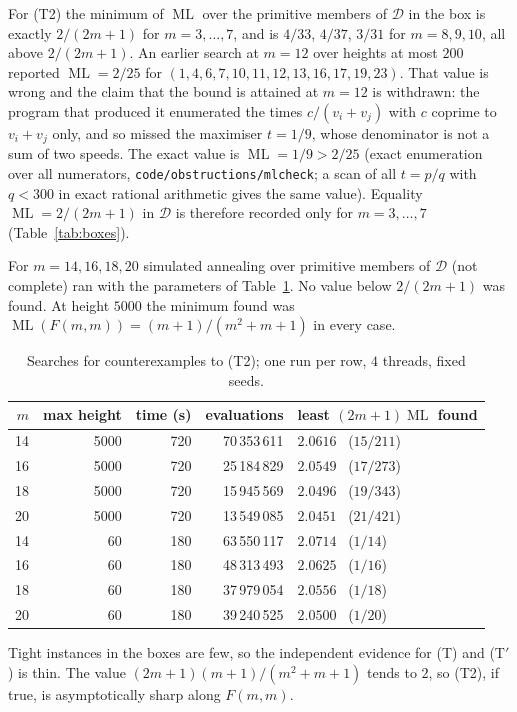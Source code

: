 \documentclass[11pt]{amsart}
\theoremstyle{plain}
\theoremstyle{definition}
\theoremstyle{remark}
\newcommand{\ML}{\operatorname{ML}}
\begin{document}
For (T2) the minimum of $\ML$ over the primitive members of $\mathcal D$ in the box is exactly
$2/(2m+1)$ for $m=3,\dots,7$, and is $4/33$, $4/37$, $3/31$ for $m=8,9,10$, all above
$2/(2m+1)$. An earlier search at $m=12$ over heights at most $200$ reported $\ML=2/25$ for
$(1,4,6,7,10,11,12,13,16,17,19,23)$. That value is wrong and the claim that the bound is attained at $m=12$ is withdrawn:
the program that produced it enumerated the times $c/(v_i+v_j)$ with $c$ coprime to $v_i+v_j$ only, and so missed the maximiser
$t=1/9$, whose denominator is not a sum of two speeds. The exact value is $\ML=1/9>2/25$ (exact enumeration over all numerators,
\texttt{code/obstructions/mlcheck}; a scan of all $t=p/q$ with $q<300$ in exact rational arithmetic gives the same value). Equality $\ML=2/(2m+1)$
in $\mathcal D$ is therefore recorded only for $m=3,\dots,7$ (Table~\ref{tab:boxes}).

For $m=14,16,18,20$ simulated annealing over primitive members of $\mathcal D$ (not complete) ran
with the parameters of Table~\ref{tab:t2}. No value below $2/(2m+1)$ was found. At height $5000$
the minimum found was $\ML(F(m,m))=(m+1)/(m^2+m+1)$ in every case.

\begin{table}[h]
\centering
\begin{tabular}{rrrrl}
\toprule
$m$ & max height & time (s) & evaluations & least $(2m+1)\ML$ found\\
\midrule
14 & 5000 & 720 & 70\,353\,611 & $2.0616$ \ ($15/211$)\\
16 & 5000 & 720 & 25\,184\,829 & $2.0549$ \ ($17/273$)\\
18 & 5000 & 720 & 15\,945\,569 & $2.0496$ \ ($19/343$)\\
20 & 5000 & 720 & 13\,549\,085 & $2.0451$ \ ($21/421$)\\
14 & 60 & 180 & 63\,550\,117 & $2.0714$ \ ($1/14$)\\
16 & 60 & 180 & 48\,313\,493 & $2.0625$ \ ($1/16$)\\
18 & 60 & 180 & 37\,979\,054 & $2.0556$ \ ($1/18$)\\
20 & 60 & 180 & 39\,240\,525 & $2.0500$ \ ($1/20$)\\
\bottomrule
\end{tabular}
\caption{Searches for counterexamples to (T2); one run per row, $4$ threads, fixed seeds.}\label{tab:t2}
\end{table}

Tight instances in the boxes are few, so the independent evidence for (T) and (T$'$) is thin.
The value $(2m+1)(m+1)/(m^2+m+1)$ tends to $2$, so (T2), if true, is asymptotically sharp along
$F(m,m)$.
\end{document}
